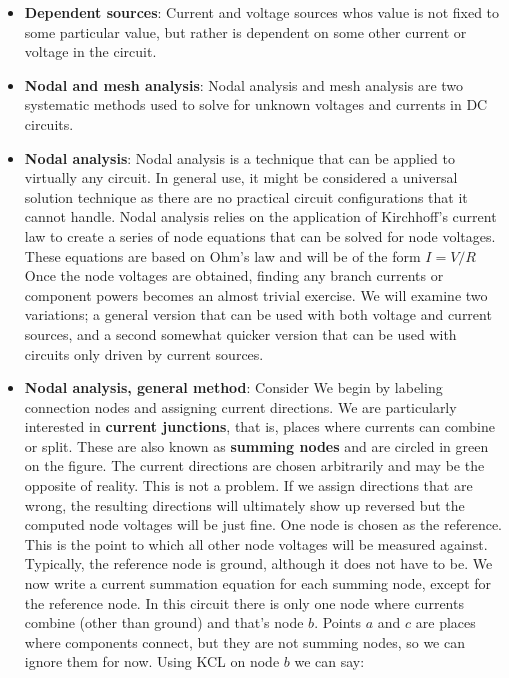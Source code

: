 \documentclass{report}
\begin{document}
\begin{itemize}
    \end{itemize}

    \pagebreak 
    \begin{itemize}
        \item \textbf{Dependent sources}: Current and voltage sources whos value is not fixed to some particular value, but rather is dependent on some other current or voltage in the circuit.
        \item \textbf{Nodal and mesh analysis}: Nodal analysis and mesh analysis are two systematic methods used to solve for unknown voltages and currents in DC circuits.
        \item \textbf{Nodal analysis}: Nodal analysis is a technique that can be applied to virtually any circuit. In general use, it might be considered a universal solution technique as there are no practical circuit configurations that it cannot handle. Nodal analysis relies on the application of Kirchhoff's current law to create a series of node equations that can be solved for node voltages. These equations are based on Ohm's law and will be of the form $I = V/R$
            \bigbreak \noindent 
            Once the node voltages are obtained, finding any branch currents or component powers becomes an almost trivial exercise. We will examine two variations; a general version that can be used with both voltage and current sources, and a second somewhat quicker version that can be used with circuits only driven by current sources.
        \item \textbf{Nodal analysis, general method}: Consider
            \bigbreak \noindent 
            \bigbreak \noindent 
            We begin by labeling connection nodes and assigning current directions. We are particularly interested in \textbf{current junctions}, that is, places where currents can combine or split. These are also known as \textbf{summing nodes} and are circled in green on the figure. The current directions are chosen arbitrarily and may be the opposite of reality. This is not a problem. If we assign directions that are wrong, the resulting directions will ultimately show up reversed but the computed node voltages will be just fine.
            \bigbreak \noindent 
            One node is chosen as the reference. This is the point to which all other node voltages will be measured against. Typically, the reference node is ground, although it does not have to be.
            \bigbreak \noindent 
            We now write a current summation equation for each summing node, except for the reference node. In this circuit there is only one node where currents combine (other than ground) and that's node $b$. Points $a$ and $c$ are places where components connect, but they are not summing nodes, so we can ignore them for now. Using KCL on node $b$ we can say:

\end{itemize}
\end{document}
